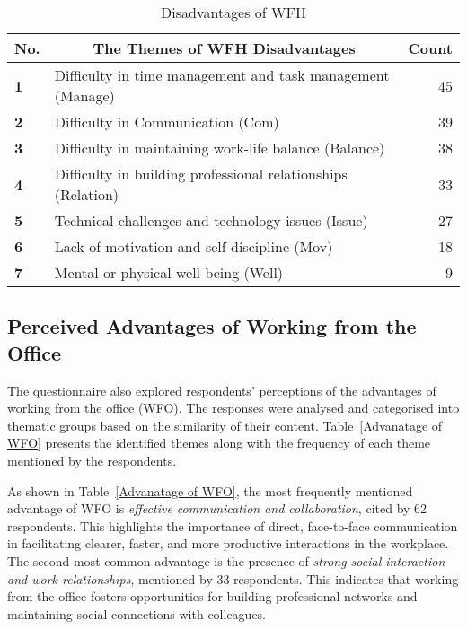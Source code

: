 \documentclass[a4paper, conference]{IEEEtran}
\begin{document}
\begin{table}[ht]
	\caption{Disadvantages of WFH}
	\label{Disadvantages of WFH}
	\begin{tabular}{|p{}|p{}|r|}
		\hline
		\multicolumn{1}{|c|}{\textbf{No.}} & \multicolumn{1}{c|}{\textbf{The Themes of WFH Disadvantages}} & \multicolumn{1}{c|}{\textbf{Count}} \\ \hline
		\textbf{1}                 & Difficulty in time management and task management (Manage) & 45 %
		\\ \hline
		\textbf{2}                 & Difficulty in Communication (Com) & 39 %
		\\ \hline
		\textbf{3}                 & Difficulty in maintaining work-life balance (Balance)    & 38 %
		\\ \hline
		\textbf{4}                 & Difficulty in building professional relationships (Relation)  & 33 %
		\\ \hline
		\textbf{5}                 & Technical challenges and technology issues (Issue)     & 27
		\\ \hline
		\textbf{6}                 & Lack of motivation and self-discipline (Mov)       & 18 %
		\\ \hline
		\textbf{7}                 & Mental or physical well-being (Well) & 9               \\ \hline
	\end{tabular}
\end{table}


\subsection{Perceived Advantages of Working from the Office}
\label{sec:advantage-wfo}

The questionnaire also explored respondents' perceptions of the advantages of working from the office (WFO). The responses were analysed and categorised into thematic groups based on the similarity of their content. Table~\ref{Advanatage of WFO} presents the identified themes along with the frequency of each theme mentioned by the respondents.

As shown in Table~\ref{Advanatage of WFO}, the most frequently mentioned advantage of WFO is \textit{effective communication and collaboration}, cited by 62 respondents. This highlights the importance of direct, face-to-face communication in facilitating clearer, faster, and more productive interactions in the workplace. The second most common advantage is the presence of \textit{strong social interaction and work relationships}, mentioned by 33 respondents. This indicates that working from the office fosters opportunities for building professional networks and maintaining social connections with colleagues.
\end{document}
